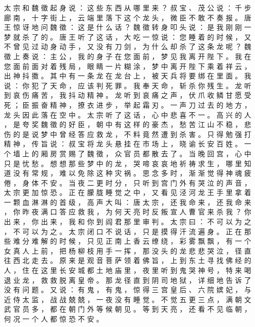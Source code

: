 {太 宗 和 魏 徵 起 身 说 ： 这 些 东 西 从 哪 里 来 ？ 叔 宝 、 茂 公 说 ： 千 步 廊 南 ， 十 字 街 上 ， 云 端 里 落 下 这 个 龙 头 ， 微 臣 不 敢 不 奏 报 。
唐 王 惊 讶 地 问 魏 徵 ： 这 是 什 么 话 ？ 魏 徵 转 身 叩 头 说 ： 是 我 刚 刚 一 梦 就 杀 了 的 。
唐 王 听 了 这 话 ， 大 吃 一 惊 说 ： 您 睡 着 的 时 候 ， 又 不 曾 见 过 动 身 动 手 ， 又 没 有 刀 剑 ， 为 什 么 却 杀 了 这 条 龙 呢 ？ 魏 徵 上 奏 说 ： 主 公 ， 我 的 身 子 在 您 面 前 ， 梦 见 我 离 开 陛 下 。
我 在 您 面 前 面 对 着 残 局 ， 眼 睛 一 片 糊 涂 ， 梦 中 离 开 陛 下 乘 着 祥 云 ， 出 神 抖 擞 。
其 中 有 一 条 龙 在 龙 台 上 ， 被 天 兵 将 要 绑 在 里 面 。
我 说 ： 你 犯 了 天 命 ， 应 该 判 死 罪 。
我 奉 天 命 ， 斩 杀 你 残 生 。
龙 听 到 哀 伤 痛 苦 ， 我 抖 动 精 神 。
龙 听 到 哀 痛 之 声 ， 伏 爪 收 鳞 甘 愿 受 死 ； 臣 振 奋 精 神 ， 撩 衣 进 步 ， 举 起 霜 刃 。
一 声 刀 过 去 的 地 方 ， 龙 头 因 此 落 在 空 中 。
太 宗 听 了 这 话 ， 心 中 悲 喜 不 一 。
高 兴 的 人 ， 是 夸 奖 魏 徵 的 好 臣 ， 朝 中 有 这 样 的 豪 杰 ， 愁 苦 江 山 不 稳 ， 悲 伤 的 是 说 梦 中 曾 经 答 应 救 龙 ， 不 料 竟 然 遭 到 杀 害 。
只 得 勉 强 打 精 神 ， 传 旨 说 ： 叔 宝 将 龙 头 悬 挂 在 市 场 上 ， 晓 谕 长 安 百 姓 。
一 个 墙 上 的 厢 房 赏 赐 了 魏 徵 ， 众 官 员 都 散 去 了 。
当 晚 回 宫 ， 心 中 只 是 忧 愁 。
想 想 那 些 梦 中 的 龙 ， 哭 啼 哀 哀 地 祈 祷 求 生 ， 哪 里 知 道 没 有 常 规 ， 难 以 免 除 这 种 灾 祸 。
思 念 多 时 ， 渐 渐 觉 得 神 魂 疲 倦 ， 身 体 不 安 。
当 夜 二 更 时 分 ， 只 听 到 宫 门 外 有 哭 泣 的 声 音 ， 太 宗 更 加 惊 恐 。
正 在 朦 胧 睡 觉 之 中 ， 又 看 见 泾 河 龙 王 手 里 拿 着 一 颗 血 淋 淋 的 首 级 ， 高 声 大 叫 ： 唐 太 宗 ， 还 我 命 来 ， 还 我 命 来 ， 你 昨 夜 满 口 答 应 救 我 ， 为 何 天 亮 时 反 叛 宣 人 曹 官 来 杀 我 ？ 你 出 来 ， 你 出 来 ， 我 和 你 到 阎 君 那 里 审 判 。
太 宗 曰 ： 不 可 以 为 之 ， 不 可 以 为 之 。
太 宗 闭 口 不 说 话 ， 只 是 摸 得 汗 流 遍 身 。
正 在 那 些 难 分 难 解 的 时 候 ， 只 见 正 南 上 香 云 缭 绕 ， 彩 雾 飘 飘 ， 有 一 个 女 真 人 上 前 ， 把 杨 柳 枝 用 手 一 挥 ， 那 没 头 的 龙 悲 悲 哭 泣 ， 径 直 往 西 北 走 去 。
原 来 是 观 音 菩 萨 领 着 佛 旨 ， 上 到 东 土 寻 找 佛 经 的 人 ， 住 在 这 里 长 安 城 都 土 地 庙 里 ， 夜 里 听 到 鬼 哭 神 号 ， 特 来 喝 退 业 龙 ， 救 救 脱 离 皇 帝 。
那 龙 径 直 到 阴 司 地 狱 ， 详 细 地 告 诉 了 没 有 问 题 。
又 说 ： 有 鬼 ， 有 鬼 ， 惊 得 三 宫 皇 后 、 六 院 嫔 妃 ， 与 近 侍 太 监 ， 战 战 兢 兢 ， 一 夜 没 有 睡 觉 。
不 觉 五 更 三 点 ， 满 朝 文 武 官 员 多 ， 都 在 朝 门 外 等 候 朝 见 。
等 到 天 亮 ， 还 看 不 见 临 朝 ， 何 况 一 个 人 都 惊 恐 不 安 。
}
